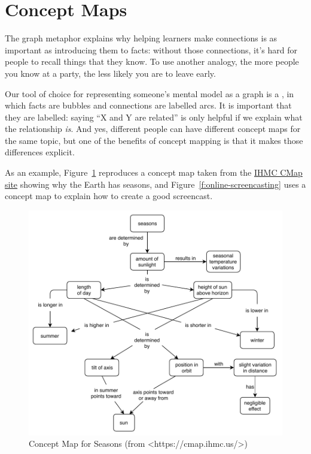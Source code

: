 \section{Concept Maps}\label{s:memory-concept-maps}

The graph metaphor explains why helping learners make connections is as
important as introducing them to facts: without those connections, it's
hard for people to recall things that they know. To use another analogy,
the more people you know at a party, the less likely you are to leave
early.

Our tool of choice for representing someone's mental model as a graph is
a , in which facts are bubbles
and connections are labelled arcs. It is important that they are
labelled: saying ``X and Y are related'' is only helpful if we explain
what the relationship \emph{is}. And yes, different people can have different
concept maps for the same topic, but one of the benefits of concept
mapping is that it makes those differences explicit.

As an example, Figure~\ref{f:memory-seasons} reproduces a concept map
taken from the \href{https://cmap.ihmc.us/}{IHMC CMap site} showing why the
Earth has seasons, and Figure~\ref{f:online-screencasting} uses a concept
map to explain how to create a good screencast.

\begin{figure}
\centering
\includegraphics{../../figures/seasons.pdf}
\caption{Concept Map for Seasons (from \textless{}https://cmap.ihmc.us/\textgreater{})}
\label{f:memory-seasons}
\end{figure}

